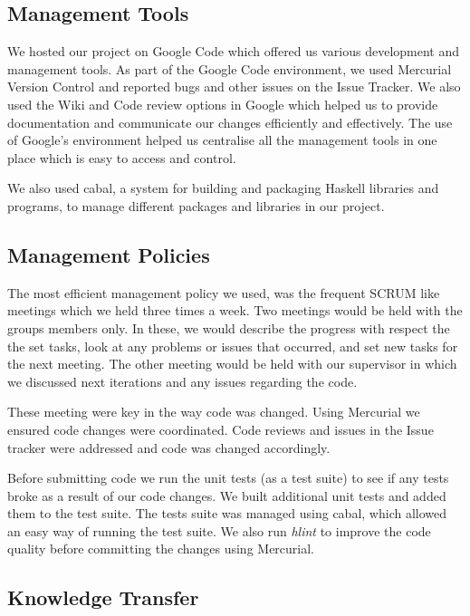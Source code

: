 \subsection*{Management Tools}

We hosted our project on Google Code which offered us various development and management tools. As part of the Google Code environment, we used Mercurial Version Control and reported bugs and other issues on the Issue Tracker. We also used the Wiki and Code review options in Google which helped us to provide documentation and communicate our changes efficiently and effectively. The use of Google's environment helped us centralise all the management tools in one place which is easy to access and control.

We also used cabal, a system for building and packaging Haskell libraries and programs, to manage different packages and libraries in our project. 

\subsection*{Management Policies}

The most efficient management policy we used, was the frequent SCRUM like meetings which we held three times a week. Two meetings would be held with the groups members only. In these, we would describe the progress with respect the the set tasks, look at any problems or issues that occurred, and set new tasks for the next meeting. The other meeting would be held with our supervisor in which we discussed next iterations and any issues regarding the code. 

These meeting were key in the way code was changed. Using Mercurial we ensured code changes were coordinated. Code reviews and issues in the Issue tracker were addressed and code was changed accordingly. 

Before submitting code we run the unit tests (as a test suite) to see if any tests broke as a result of our code changes. We built additional unit tests and added them to the test suite. The tests suite was managed using cabal, which allowed an easy way of running the test suite. We also run \emph{hlint} to improve the code quality before committing the changes using Mercurial. 

\subsection*{Knowledge Transfer}

